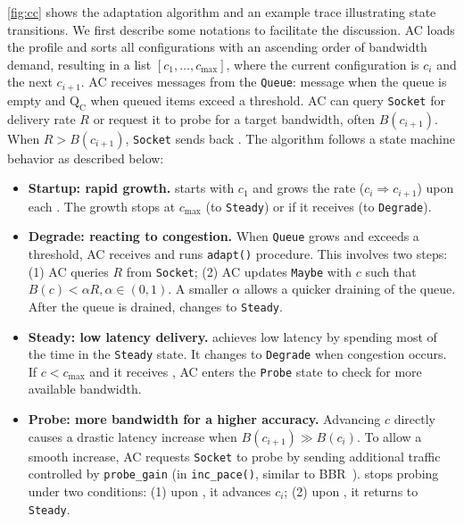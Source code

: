 \autoref{fig:cc} shows the adaptation algorithm and an example trace
illustrating state transitions. We first describe some notations to facilitate
the discussion. AC loads the profile and sorts all configurations with an
ascending order of bandwidth demand, resulting in a list $[c_1, \dots,
c_{\max}]$, where the current configuration is $c_i$ and the next $c_{i+1}$. AC
receives messages from the \texttt{Queue}: message \qe{} when the queue is empty
and $\text{Q}_\text{C}$ when queued items exceed a threshold. AC can query
\texttt{Socket} for delivery rate $R$ or request it to probe for a target
bandwidth, often $B(c_{i+1})$. When $R > B(c_{i+1})$, \texttt{Socket} sends back
\spd{}. The algorithm follows a state machine behavior as described below:

\begin{itemize}[leftmargin=*]

\item \textbf{Startup: rapid growth.} \sysname{} starts with $c_1$ and grows the
  rate ($c_i \Rightarrow c_{i+1}$) upon each \qe{}. The growth stops at
  $c_{\max}$ (to \texttt{Steady}) or if it receives \qc{} (to \texttt{Degrade}).

\item \textbf{Degrade: reacting to congestion.} When \texttt{Queue} grows and
  exceeds a threshold, AC receives \qc{} and runs \texttt{adapt()}
  procedure. This involves two steps: (1) AC queries $R$ from \texttt{Socket};
  (2) AC updates \texttt{Maybe} with $c$ such that
  $B(c) < \alpha R, \alpha \in (0, 1)$. A smaller $\alpha$ allows a quicker
  draining of the queue. After the queue is drained, \sysname{} changes to
  \texttt{Steady}.

\item \textbf{Steady: low latency delivery.} \sysname{} achieves low latency by
  spending most of the time in the \texttt{Steady} state. It changes to
  \texttt{Degrade} when congestion occurs. If $c < c_{\max}$ and it receives
  \qe{}, AC enters the \texttt{Probe} state to check for more available
  bandwidth.

\item \textbf{Probe: more bandwidth for a higher accuracy.} Advancing $c$
  directly causes a drastic latency increase when $B(c_{i+1}) \gg B(c_i)$. To
  allow a smooth increase, AC requests \texttt{Socket} to probe by sending
  additional traffic controlled by \texttt{probe\_gain} (in
  \texttt{inc\_pace()}, similar to BBR~\cite{cardwell2017bbr}). \sysname{} stops
  probing under two conditions: (1) upon \spd{}, it advances $c_i$; (2) upon
  \qc{}, it returns to \texttt{Steady}.

\end{itemize}

